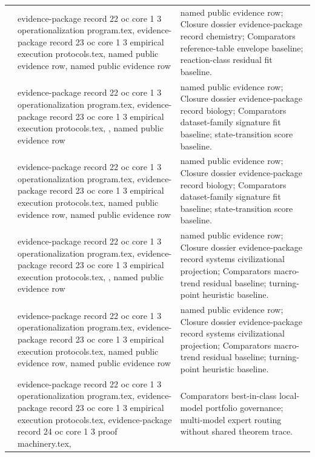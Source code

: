\begin{longtable}{@{}L{0.16\textwidth}L{0.38\textwidth}L{0.34\textwidth}@{}}
 & evidence-package record 22 oc core 1 3 operationalization program.tex, \allowbreak evidence-package record 23 oc core 1 3 empirical execution protocols.tex, named public evidence row, named public evidence row & named public evidence row; Closure dossier evidence-package record chemistry; Comparators reference-table envelope baseline; reaction-class residual fit baseline. \\
 & evidence-package record 22 oc core 1 3 operationalization program.tex, \allowbreak evidence-package record 23 oc core 1 3 empirical execution protocols.tex, \allowbreak {}, named public evidence row & named public evidence row; Closure dossier evidence-package record biology; Comparators dataset-family signature fit baseline; state-transition score baseline. \\
 & evidence-package record 22 oc core 1 3 operationalization program.tex, \allowbreak evidence-package record 23 oc core 1 3 empirical execution protocols.tex, named public evidence row, named public evidence row & named public evidence row; Closure dossier evidence-package record biology; Comparators dataset-family signature fit baseline; state-transition score baseline. \\
 & evidence-package record 22 oc core 1 3 operationalization program.tex, \allowbreak evidence-package record 23 oc core 1 3 empirical execution protocols.tex, \allowbreak {}, named public evidence row & named public evidence row; Closure dossier evidence-package record systems civilizational projection; Comparators macro-trend residual baseline; turning-point heuristic baseline. \\
 & evidence-package record 22 oc core 1 3 operationalization program.tex, \allowbreak evidence-package record 23 oc core 1 3 empirical execution protocols.tex, named public evidence row, named public evidence row & named public evidence row; Closure dossier evidence-package record systems civilizational projection; Comparators macro-trend residual baseline; turning-point heuristic baseline. \\
 & evidence-package record 22 oc core 1 3 operationalization program.tex, \allowbreak evidence-package record 23 oc core 1 3 empirical execution protocols.tex, \allowbreak evidence-package record 24 oc core 1 3 proof machinery.tex, \allowbreak {} & Comparators best-in-class local-model portfolio governance; multi-model expert routing without shared theorem trace. \\
\bottomrule
\end{longtable}


